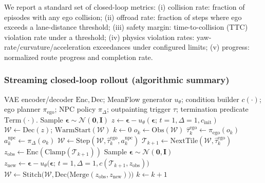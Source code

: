 \documentclass{article}
\newcommand{\Enc}{\mathrm{Enc}}
\newcommand{\Dec}{\mathrm{Dec}}
\theoremstyle{plain}
\theoremstyle{definition}
\theoremstyle{remark}
\begin{document}
We report a standard set of closed-loop metrics:
(i) collision rate: fraction of episodes with any ego collision;
(ii) offroad rate: fraction of steps where ego exceeds a lane-distance threshold;
(iii) safety margin: time-to-collision (TTC) violation rate under a threshold;
(iv) physics violation rates: yaw-rate/curvature/acceleration exceedances under configured limits;
(v) progress: normalized route progress and completion rate.


\subsubsection{Streaming closed-loop rollout (algorithmic summary)}
\label{app:streaming_rollout}

\begin{algorithm}[t]
\caption{Streaming closed-loop rollout with on-demand outpainting}
\label{alg:streaming}
\begin{algorithmic}[1]
\REQUIRE VAE encoder/decoder \(\Enc,\Dec\); MeanFlow generator \(u_{\theta}\); condition builder \(c(\cdot)\);
ego planner \(\pi_{\mathrm{ego}}\); NPC policy \(\pi_{\Delta}\);
outpainting trigger \(\tau\); termination predicate \(\mathrm{Term}(\cdot)\).
\STATE Sample \(\boldsymbol{\epsilon}\sim \mathcal{N}(\mathbf{0},\mathbf{I})\)
\STATE \(z \leftarrow \boldsymbol{\epsilon}-u_{\theta}(\boldsymbol{\epsilon};\,t{=}1,\Delta{=}1,c_{\mathrm{init}})\)
\STATE \(\mathcal{W}\leftarrow \Dec(z)\); \(\mathrm{WarmStart}(\mathcal{W})\)
\STATE \(k \leftarrow 0\)
  \STATE \(o_{k} \leftarrow \mathrm{Obs}(\mathcal{W})\)
  \STATE \(\hat{\tau}^{\mathrm{ego}}_{k} \leftarrow \pi_{\mathrm{ego}}(o_{k})\)
  \STATE \(a^{\mathrm{npc}}_{k} \leftarrow \pi_{\Delta}(o_{k})\)
  \STATE \(\mathcal{W} \leftarrow \mathrm{Step}(\mathcal{W},\hat{\tau}^{\mathrm{ego}}_{k},a^{\mathrm{npc}}_{k})\)
    \STATE \(\mathcal{T}_{k{+}1} \leftarrow \mathrm{NextTile}(\mathcal{W},\hat{\tau}^{\mathrm{ego}}_{k})\)
    \STATE \(z_{\mathrm{obs}}\leftarrow \Enc(\mathrm{Clamp}(\mathcal{T}_{k{+}1}))\)
    \STATE Sample \(\boldsymbol{\epsilon}\sim \mathcal{N}(\mathbf{0},\mathbf{I})\)
    \STATE \(z_{\mathrm{new}} \leftarrow \boldsymbol{\epsilon}-u_{\theta}\!\big(\boldsymbol{\epsilon};\,t{=}1,\Delta{=}1,c(\mathcal{T}_{k{+}1},z_{\mathrm{obs}})\big)\)
    \STATE \(\mathcal{W} \leftarrow \mathrm{Stitch}\!\Big(\mathcal{W},\Dec\big(\mathrm{Merge}(z_{\mathrm{obs}},z_{\mathrm{new}})\big)\Big)\)
  \ENDIF
  \STATE \(k \leftarrow k+1\)
\ENDWHILE
\end{algorithmic}
\end{algorithm}
\end{document}
